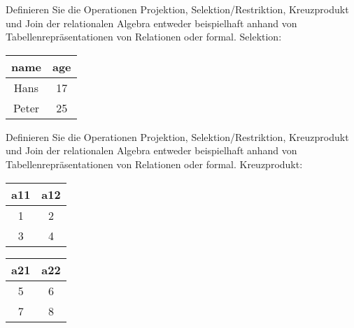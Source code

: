 \begin{frame}{Definieren Sie die Operationen Projektion, Selektion/Restriktion, Kreuzprodukt und Join der relationalen Algebra entweder beispielhaft anhand von Tabellenrepräsentationen von Relationen oder formal.}
Selektion: 
\newline
\newline
\begin{tabular}{ | c | c | }
	\hline
	name 	& 		age	\\
	\hline
	Hans 	& 		17 	\\
	\hline
	Peter 	&		25	\\
	\hline
\end{tabular} 
\end{frame}

\begin{frame}{Definieren Sie die Operationen Projektion, Selektion/Restriktion, Kreuzprodukt und Join der relationalen Algebra entweder beispielhaft anhand von Tabellenrepräsentationen von Relationen oder formal.}
Kreuzprodukt: 
\newline
\newline
\begin{tabular}{ | c | c | }
	\hline
	a11		&		a12		\\
	\hline
	1 		& 		2 		\\
	\hline
	3 		& 		4 		\\
	\hline
\end{tabular}
\begin{tabular}{ | c | c | }
	\hline
	a21 	&		a22	\\
	\hline
	5 		& 		6 		\\
	\hline
	7 		& 		8 		\\
	\hline
\end{tabular}
\end{frame}

